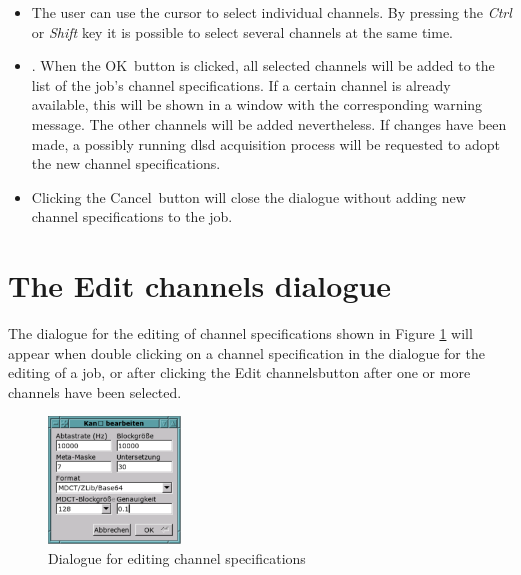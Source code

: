 \documentclass[a4paper,12pt,BCOR6mm,bibtotoc,idxtotoc]{scrbook}
\begin{document}
\begin{itemize} 
\item The user can use the cursor to select individual channels. By pressing the \textit{Ctrl} or \textit{Shift} key it is possible to select several channels at the same time. 
\item. When the \glqq OK\grqq\  button is clicked, all selected channels will be added to the list of the job’s channel specifications. If a certain channel is already available, this will be shown in a window with the corresponding warning message. The other channels will be added nevertheless. If changes have been made, a possibly running dlsd acquisition process will be requested to adopt the new channel specifications. 
\item Clicking the \glqq Cancel\grqq\  button will close the dialogue without adding new channel specifications to the job. \end{itemize}


\section{The \glqq Edit channels dialogue\grqq} \label{sec:manager_kanaele_edit}

The dialogue for the editing of channel specifications shown in Figure \ref{fig:dls_ctl_channel} will appear when double clicking on a channel specification in the dialogue for the editing of a job, or after clicking the \glqq Edit channels\grqq button after one or more channels have been selected.

\begin{figure}[tbh] \begin{center} \includegraphics[width=100pt]{bilder/ctl_channel} \end{center} \caption{Dialogue for editing channel specifications} \label{fig:dls_ctl_channel} \end{figure}

\end{document}
